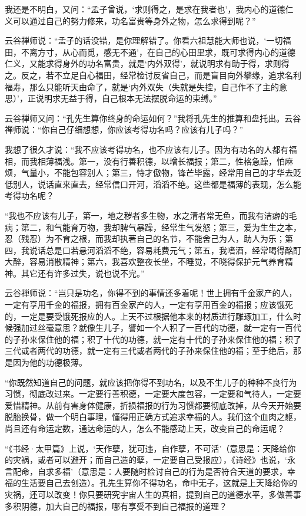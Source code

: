 \documentclass[12pt,UTF8]{ctexbook}
\begin{document}
我还是不明白，又问：“孟子曾说，‘求则得之，是求在我者也’，我内心的道德仁义可以通过自己的努力修来，功名富贵等身外之物，怎么求得到呢？”

云谷禅师说：“孟子的话没错，是你理解错了。你看六祖慧能大师也说，‘一切福田，不离方寸，从心而觅，感无不通’，在自己的心田里求，既可求得内心的道德仁义，又能求得身外的功名富贵，就是‘内外双得’，就说明求有助于得，求则得之。反之，若不立足自心福田，经常检讨反省自己，而是盲目向外攀缘，追求名利福寿，那么只能听天由命了，就是‘内外双失（失就是失控，自己作不了主的意思）’，正说明求无益于得，自己根本无法摆脱命运的束缚。”

云谷禅师又问：“孔先生算你终身的命运如何？”我将孔先生的推算和盘托出。云谷禅师说：“你自己仔细想想，你应该考得功名吗？应该有儿子吗？”

我想了很久才说：“我不应该考得功名，也不应该有儿子。因为有功名的人都有福相，而我相薄福浅。第一，没有行善积德，以增长福报；第二，性格急躁，怕麻烦，气量小，不能包容别人；第三，恃才傲物，锋芒毕露，经常用自己的才华去贬低别人，说话直来直去，经常信口开河，滔滔不绝。这些都是福薄的表现，怎么能考得功名呢？

“我也不应该有儿子，第一，地之秽者多生物，水之清者常无鱼，而我有洁癖的毛病；第二，和气能育万物，我却脾气暴躁，经常生气发怒；第三，爱为生生之本，忍（残忍）为不育之根，而我却执著自己的名节，不能舍己为人，助人为乐；第四，我说话总是口若悬河滔滔不绝，容易耗费元气；第五，我嗜酒，经常喝得酩酊大醉，容易消散精神；第六，我喜欢整夜长坐，不睡觉，不晓得保护元气养育精神。其它还有许多过失，说也说不完。”

云谷禅师说：“岂只是功名，你得不到的事情还多着呢！世上拥有千金家产的人，一定有享用千金的福报，拥有百金家产的人，一定有享用百金的福报；应该饿死的，一定是要受饿死报应的人。上天不过根据他本来的材质进行雕琢加工，什么时候强加过丝毫意思？就像生儿子，譬如一个人积了一百代的功德，就一定有一百代的子孙来保住他的福；积了十代的功德，就一定有十代的子孙来保住他的福；积了三代或者两代的功德，就一定有三代或者两代的子孙来保住他的福；至于绝后，那是因为他的功德极薄。

“你既然知道自己的问题，就应该把你得不到功名，以及不生儿子的种种不良行为习惯，彻底改过来。一定要行善积德，一定要大度包容，一定要和气待人，一定要爱惜精神。从前有害身体健康，折损福报的行为习惯都要彻底改掉，从今天开始要脱胎换骨，做一个明白事理，懂得用正确方式追求幸福的人。我们这个血肉之躯，尚且还有命运定数，通达命运的人，怎么不能感动上天，改变自己的命运呢？

“《书经·太甲篇》上说，‘天作孽，犹可违，自作孽，不可活’（意思是：天降给你的灾祸，或者可以避开；而自己造的孽，一定要自己受报应），《诗经》也说，‘永言配命，自求多福’（意思是：人要随时检讨自己的行为是否符合天道的要求，幸福的生活要自己去创造）。孔先生算你不得功名，命中无子，这就是上天降给你的灾祸，还可以改变！你只要研究宇宙人生的真相，提到自己的道德水平，多做善事多积阴德，加大自己的福报，哪有享受不到自己福报的道理？
\end{document}
